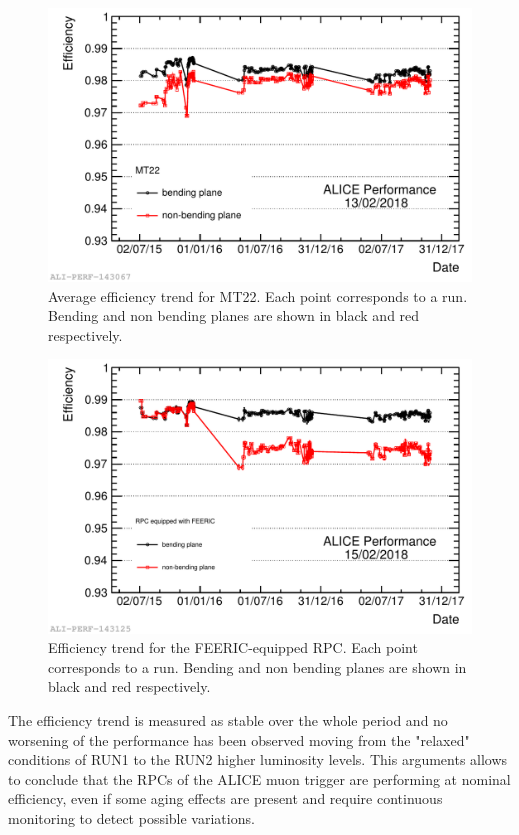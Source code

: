 \begin{figure}[!ht]
\begin{center}
\includegraphics[width=0.8\linewidth]{Chapters/Performance/Figs/2018-Feb-16-effTrend_2015-2017_Ch14.pdf}
\caption{Average efficiency trend for MT22. Each point corresponds to a run. Bending and non bending planes are shown in black and red respectively.}
\label{fig:MTR22efficiency}
\end{center}
\end{figure}

\begin{figure}[!hb]
\begin{center}
\includegraphics[width=0.8\linewidth]{Chapters/Performance/Figs/2018-Feb-16-effTrend_2015-2017_FEERIC.pdf}
\caption{Efficiency trend for the FEERIC-equipped RPC. Each point corresponds to a run. Bending and non bending planes are shown in black and red respectively.}
\label{fig:MTRFEERICefficiency}
\end{center}
\end{figure}

The efficiency trend is measured as stable over the whole period and no worsening of the performance has been observed moving from the "relaxed" conditions of RUN1 to the RUN2 higher luminosity levels.
This arguments allows to conclude that the RPCs of the ALICE muon trigger are performing at nominal efficiency, even if some aging effects are present and require continuous monitoring to detect possible variations.